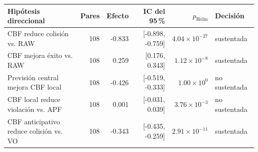 \begin{tabular}{p{4.6cm}rrrrl}
\toprule
Hipótesis direccional & Pares & Efecto & IC del 95\,\% & $p_{\mathrm{Holm}}$ & Decisión \\
\midrule
CBF reduce colisión vs. RAW & 108 & -0.833 & [-0.898, -0.759] & $4.04\times10^{-27}$ & sustentada \\
CBF mejora éxito vs. RAW & 108 & 0.259 & [0.176, 0.343] & $1.12\times10^{-8}$ & sustentada \\
Previsión central mejora CBF local & 108 & -0.426 & [-0.519, -0.333] & $1.00\times10^{0}$ & no sustentada \\
CBF local reduce violación vs. APF & 108 & 0.001 & [-0.031, 0.039] & $3.76\times10^{-3}$ & no sustentada \\
CBF anticipativo reduce colisión vs. VO & 108 & -0.343 & [-0.435, -0.259] & $2.91\times10^{-11}$ & sustentada \\
\bottomrule
\end{tabular}
